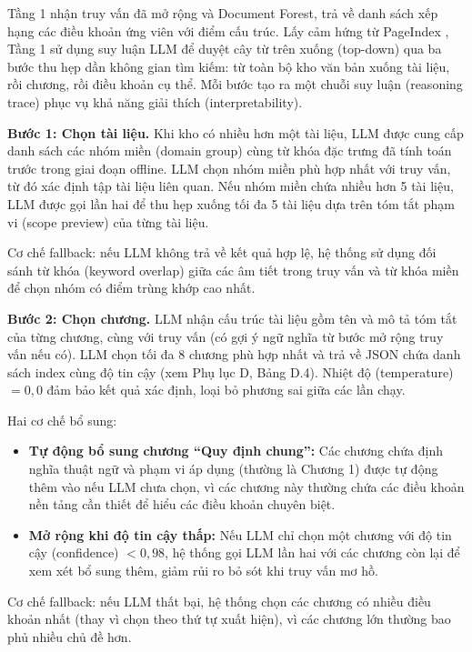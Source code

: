 Tầng 1 nhận truy vấn đã mở rộng và Document Forest, trả về danh sách xếp hạng
các điều khoản ứng viên với điểm cấu trúc. Lấy cảm hứng từ PageIndex
\cite{zhang2025pageindex}, Tầng 1 sử dụng suy luận LLM để duyệt cây từ trên xuống
(top-down) qua ba bước thu hẹp dần không gian tìm kiếm: từ toàn bộ kho văn
bản xuống tài liệu, rồi chương, rồi điều khoản cụ thể. Mỗi bước tạo ra một
chuỗi suy luận (reasoning trace) phục vụ khả năng giải thích (interpretability).

\textbf{Bước 1: Chọn tài liệu.}
Khi kho có nhiều hơn một tài liệu, LLM được cung cấp danh sách các nhóm miền
(domain group) cùng từ khóa đặc trưng đã tính toán trước trong giai đoạn offline.
LLM chọn nhóm miền phù hợp nhất với truy vấn, từ đó xác định tập tài liệu liên
quan. Nếu nhóm miền chứa nhiều hơn 5 tài liệu, LLM được gọi lần hai để thu hẹp
xuống tối đa 5 tài liệu dựa trên tóm tắt phạm vi (scope preview) của từng tài
liệu.

Cơ chế fallback: nếu LLM không trả về kết quả hợp lệ, hệ thống sử dụng đối sánh
từ khóa (keyword overlap) giữa các âm tiết trong truy vấn và từ khóa miền để chọn
nhóm có điểm trùng khớp cao nhất.

\textbf{Bước 2: Chọn chương.}
LLM nhận cấu trúc tài liệu gồm tên và mô tả tóm tắt của từng chương, cùng với
truy vấn (có gợi ý ngữ nghĩa từ bước mở rộng truy vấn nếu có). LLM chọn tối đa 8
chương phù hợp nhất và trả về JSON chứa danh sách index cùng độ tin cậy (xem Phụ
lục D, Bảng D.4). Nhiệt độ (temperature) $= 0{,}0$ đảm bảo kết quả xác định, loại
bỏ phương sai giữa các lần chạy.

Hai cơ chế bổ sung:
\begin{itemize}
  \item \textbf{Tự động bổ sung chương ``Quy định chung'':} Các chương chứa định
        nghĩa thuật ngữ và phạm vi áp dụng (thường là Chương 1) được tự động thêm
        vào nếu LLM chưa chọn, vì các chương này thường chứa các điều khoản nền
        tảng cần thiết để hiểu các điều khoản chuyên biệt.

  \item \textbf{Mở rộng khi độ tin cậy thấp:} Nếu LLM chỉ chọn một chương với
        độ tin cậy (confidence) $< 0{,}98$, hệ thống gọi LLM lần hai với các
        chương còn lại để xem xét bổ sung thêm, giảm rủi ro bỏ sót khi truy vấn
        mơ hồ.
\end{itemize}

Cơ chế fallback: nếu LLM thất bại, hệ thống chọn các chương có nhiều điều khoản
nhất (thay vì chọn theo thứ tự xuất hiện), vì các chương lớn thường bao phủ nhiều
chủ đề hơn.

